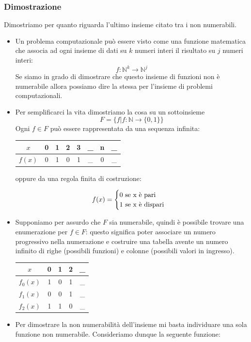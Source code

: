 \subsubsection{Dimostrazione} Dimostriamo per quanto riguarda l'ultimo insieme citato tra i non numerabili. 
\begin{itemize}
	\item Un problema computazionale può essere visto come una funzione matematica che associa ad ogni insieme di dati su $k$ numeri interi il risultato su $j$ numeri interi:
	$$ f :  \mathbb{N}^{k} \longrightarrow \mathbb{N}^{j} $$
	Se siamo in grado di dimostrare che questo insieme di funzioni non è numerabile allora possiamo dire la stessa per l’insieme di problemi computazionali.
	\item Per semplificarci la vita dimostriamo la cosa su un sottoinsieme
	\[F = \{f | f: \mathbb{N} \longrightarrow \{0, 1\}\}\]
	Ogni $f \in F$ può essere rappresentata da una sequenza infinita:
	\begin{table}[!h]
		\centering
		\begin{tabular}{c|c|c|c|c|c|c|c}
			$x$ & 0 & 1 & 2 & 3 & \_ & n & \_  \\
			\hline
			$f(x)$ & 0 & 1 & 0 & 1 & \_ & 0 & \_
		\end{tabular}
	\end{table}
	
	oppure da una regola finita di costruzione:
	
	\[f(x) =
	\begin{cases}
		$0 \text{se x è pari}$ \\
		$1 \text{se x è dispari}$
	\end{cases}\]
	\item Supponiamo per assurdo che $F$ sia numerabile, quindi è possibile trovare una enumerazione per $f \in F$: questo significa poter associare un numero progressivo nella numerazione e costruire una tabella avente un numero infinito di righe (possibili funzioni) e colonne (possibili valori in ingresso).
	\begin{table}[!h]
		\centering
		\begin{tabular}{c|c c c c}
			$x$ & 0 & 1 & 2 & \_  \\
			\hline
			$f_0(x)$ & 1 & 0 & 1 & \_ \\ 
			$f_1(x)$ & 0 & 0 & 1 & \_ \\ 
			$f_2(x)$ & 1 & 1 & 0 & \_ \\ 
		\end{tabular}
	\end{table}
	\item Per dimostrare la non numerabilità dell'insieme mi basta individuare una sola funzione non numerabile. Consideriamo dunque la seguente funzione:
	

\end{itemize}
